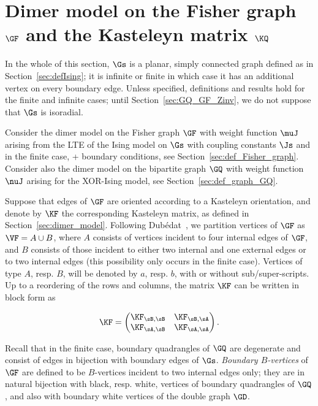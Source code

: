 \documentclass[a4paper,twoside,11pt]{article}
\begin{document}
\section{Dimer model on the Fisher graph $\GF$ and the Kasteleyn matrix $\KQ$}\label{sec:KFKQ}


In the whole of this section, $\Gs$ is a planar, simply connected graph defined as in Section~\ref{sec:defIsing}; it is infinite or finite in which case
it has an additional vertex on every boundary edge. Unless specified, 
definitions and results hold for the finite and infinite cases; until Section~\ref{sec:GQ_GF_Zinv}, we do not suppose that $\Gs$ is isoradial.

Consider the dimer model on the Fisher graph $\GF$ with weight function $\muJ$ arising from the LTE of the Ising model on $\Gs$
with coupling constants $\Js$ and in the finite case, + boundary conditions, see Section~\ref{sec:def_Fisher_graph}. 
Consider also the dimer model on the bipartite graph $\GQ$ with weight function
$\nuJ$ arising for the XOR-Ising model, see Section~\ref{sec:def_graph_GQ}. 

Suppose that edges of $\GF$ are oriented according to a Kasteleyn orientation, and denote by $\KF$ the corresponding Kasteleyn matrix,
as defined in Section~\ref{sec:dimer_model}. Following Dub\'edat~\cite{Dubedat}, we partition vertices of $\GF$ as $\VF=A\cup B$, where $A$ consists of 
vertices incident to four internal edges of $\GF$, and $B$ consists of those incident to either two internal and one external edges or
to two internal edges (this possibility only occurs in the finite case). Vertices of type $A$, resp. $B$, will be denoted by $a$, resp. 
$b$, with or without sub/super-scripts. Up to a reordering of the rows and columns, the matrix $\KF$ can be written
in block form as

\begin{equation*}
\KF=
\begin{pmatrix}
\KF_{\sB,\sB}&\KF_{\sB,\sA}\\
\KF_{\sA,\sB}&\KF_{\sA,\sA}
\end{pmatrix}.
\end{equation*}

Recall that in the finite case, boundary quadrangles of $\GQ$ are degenerate and consist of edges in bijection with boundary edges of $\Gs$. 
\emph{Boundary $B$-vertices} of $\GF$ are defined to be $B$-vertices incident to two internal edges only; they are in natural bijection with black, resp. 
white, vertices of boundary quadrangles of $\GQ$, and also with boundary white vertices of the double graph $\GD$.
\end{document}
